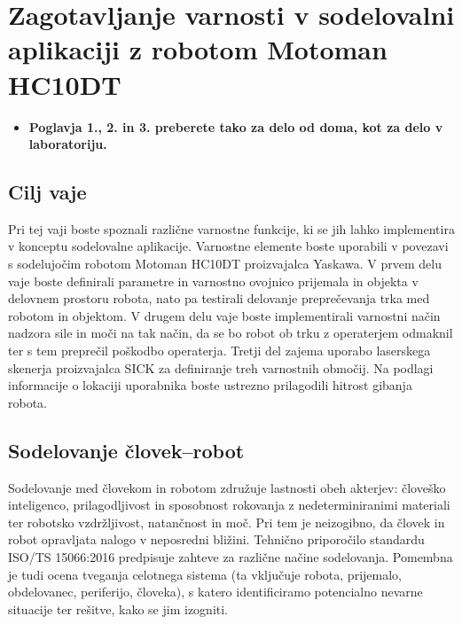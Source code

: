\chapter{Zagotavljanje varnosti v sodelovalni aplikaciji z robotom Motoman HC10DT}%


\begin{mdframed}[backgroundcolor=red!20, shadow=true,roundcorner=8pt]
	\begin{itemize}
		\item \textbf{Poglavja 1., 2. in 3. preberete tako za delo od doma, kot za delo v laboratoriju.}		
	\end{itemize}
\end{mdframed}


\begin{mdframed}[backgroundcolor=green!20, shadow=true,roundcorner=8pt]
	\vspace{-0.35cm}
	
	\section{Cilj vaje}
	
	Pri tej vaji boste spoznali različne varnostne funkcije, ki se jih lahko implementira v konceptu sodelovalne aplikacije. Varnostne elemente boste uporabili v povezavi s sodelujočim robotom Motoman HC10DT proizvajalca Yaskawa. V prvem delu vaje boste definirali parametre in varnostno ovojnico prijemala in objekta v delovnem prostoru robota, nato pa testirali delovanje preprečevanja trka med robotom in objektom. V drugem delu vaje boste implementirali varnostni način nadzora sile in moči na tak način, da se bo robot ob trku z operaterjem  odmaknil ter s tem preprečil poškodbo operaterja. Tretji del zajema uporabo laserskega skenerja proizvajalca SICK za definiranje treh varnostnih območij. Na podlagi informacije o lokaciji uporabnika boste ustrezno prilagodili hitrost gibanja robota.
	
\end{mdframed}

\section{Sodelovanje človek--robot}

Sodelovanje med človekom in robotom združuje lastnosti obeh akterjev: človeško inteligenco, prilagodljivost in sposobnost rokovanja z nedeterminiranimi materiali ter robotsko vzdržljivost, natančnost in moč. Pri tem je neizogibno, da človek in robot opravljata nalogo v neposredni bližini. Tehnično priporočilo standardu ISO/TS 15066:2016 predpisuje zahteve za različne načine sodelovanja. Pomembna je tudi ocena tveganja celotnega sistema (ta vključuje robota, prijemalo, obdelovanec, periferijo, človeka), s katero identificiramo potencialno nevarne situacije ter rešitve, kako se jim izogniti.

